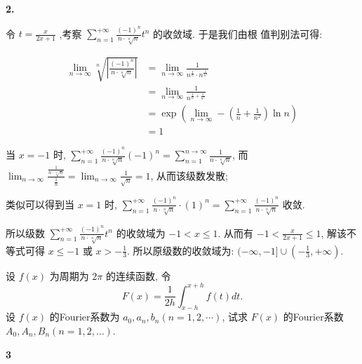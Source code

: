 \documentclass[12pt]{article}
\newenvironment{solution}[2][Solution]{\begin{trivlist}
\item[\hskip \labelsep {\bfseries #1}]}{\end{trivlist}}
\newenvironment{problem}[2][Problem]{\begin{trivlist}
\item[\hskip \labelsep {\bfseries #1}\hskip \labelsep {\bfseries #2.}]}{\end{trivlist}}
\begin{document}
\begin{solution}{2} \textbf{2.}

    令 $\displaystyle t = \frac{x}{2x+1}$ ,考察 $\displaystyle \sum_{n=1}^{+ \infty} \frac{(-1)^n}{n \cdot \sqrt[n]{n}} t^n $ 的收敛域. 于是我们由根
    值判别法可得:

    \[
        \begin{aligned}
            \lim_{n \to \infty} \sqrt[n]{\left | \frac{(-1)^n}{n \cdot \sqrt[a]{n}} \right |} &= \lim_{n \to \infty} \frac{1}{n^{\frac{1}{n}}
            \cdot n^{\frac{1}{n^2}}}  \\
            &= \lim_{n \to \infty} \frac{1}{n^{\frac{1}{n} + \frac{1}{n^2}}} \\
            &= \exp(\lim_{n \to \infty} -(\frac{1}{n} + \frac{1}{n^2}) \ln n) \\
            &= 1
        \end{aligned}
    \]

    当 $ x = -1 $ 时, $ \displaystyle \sum_{n=1}^{+ \infty} \frac{(-1)^n}{n \cdot \sqrt[n]{n}} (-1)^n = \sum_{n=1}^{n \to \infty} \frac{1}{n \cdot \sqrt[n]{n}} $,
    而 $ \displaystyle \lim_{n \to \infty} \frac{\frac{1}{n \cdot \sqrt[n]{n}}}  {\frac{1}{n}} = \lim_{n \to \infty} \frac{1}{\sqrt{n}} = 1 $, 从而该级数发散;

    类似可以得到当 $ x = 1 $ 时, $ \displaystyle\sum_{n=1}^{+\infty} \frac{(-1)^n}{n \cdot \sqrt[n]{n}} \cdot (1)^n = \sum_{n=1}^{+\infty}  \frac{(-1)^n}{n \cdot 
    \sqrt[n]{n}} $ 收敛. 
    
    所以级数 $ \displaystyle\sum_{n=1}^{+\infty} \frac{(-1)^n}{n \cdot \sqrt[n]{n}} t^n $ 的收敛域为 $ -1 < x \leq 1 $. 从而有
    $ -1 < \frac{x}{2x+1} \leq 1 $, 解该不等式可得 $ x \leq -1 $ 或 $ x > -\frac{1}{3} $. 所以原级数的收敛域为: $ (-\infty, -1] \cup (-\frac{1}{3}, +\infty)$.

\end{solution}

\vspace{3cm}



\begin{problem}{3}
    设 $f(x)$ 为周期为 $2\pi$ 的连续函数, 令
    \[
        F(x) = \frac{1}{2h} \int_{x-h}^{x+h} f(t) dt.  
    \]
    设 $f(x)$ 的Fourier系数为 $a_0, a_n, b_n(n = 1, 2, \cdots)$, 试求 $F(x)$ 的Fourier系数 $A_0, A_n, B_n(n = 1, 2, \dots)$.


\end{problem}


\begin{solution}{3} \textbf{3}
    
\end{solution}
\end{document}
